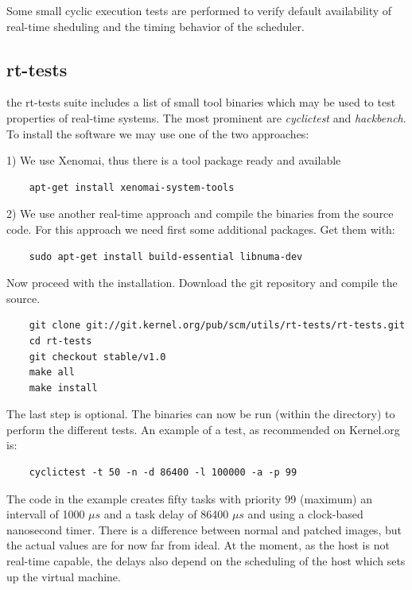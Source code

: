 \documentclass[]{scrartcl}
\begin{document}
Some small cyclic execution tests are performed to verify default availability of real-time sheduling and the timing behavior of the scheduler.

\subsection{rt-tests}

the rt-tests suite includes a list of small tool binaries which may be used to test properties of real-time systems. The most prominent are \textit{cyclictest} and \textit{hackbench}. To install the software we may use one of the two approaches:

1) We use Xenomai, thus there is a tool package ready and available

\begin{verbatim}
	apt-get install xenomai-system-tools
\end{verbatim}

2) We use another real-time approach and compile the binaries from the source code.
For this approach we need first some additional packages. Get them with:

\begin{verbatim}
	sudo apt-get install build-essential libnuma-dev
\end{verbatim}

Now proceed with the installation. Download the git repository and compile the source.

\begin{verbatim}
	git clone git://git.kernel.org/pub/scm/utils/rt-tests/rt-tests.git
	cd rt-tests
	git checkout stable/v1.0
	make all
	make install
\end{verbatim}

The last step is optional. The binaries can now be run (within the directory) to perform the different tests. An example of a test, as recommended on Kernel.org is: 

\begin{verbatim}
	cyclictest -t 50 -n -d 86400 -l 100000 -a -p 99
\end{verbatim}

The code in the example creates fifty tasks with priority 99 (maximum) an intervall of 1000 $\mu s$ and a task delay of 86400 $\mu s$ and using a clock-based nanosecond timer. There is a difference between normal and patched images, but the actual values are for now far from ideal. At the moment, as the host is not real-time capable, the delays also depend on the scheduling of the host which sets up the virtual machine. 
\end{document}
